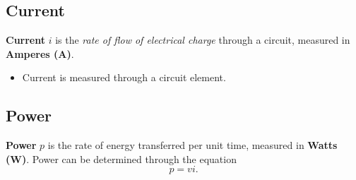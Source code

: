 \documentclass{report}
\begin{document}
\subsection{Current}
\textbf{Current} \(i\) is the \textit{rate of flow of electrical charge} through a circuit, measured in \textbf{Amperes (\unit{A})}.
\begin{itemize}
    \item Current is measured through a circuit element.
\end{itemize}
\subsection{Power}
\textbf{Power} \(p\) is the rate of energy transferred per unit time, measured in \textbf{Watts (\unit{W})}.
Power can be determined through the equation
\begin{equation*}
    p = v i.
\end{equation*}
\end{document}
